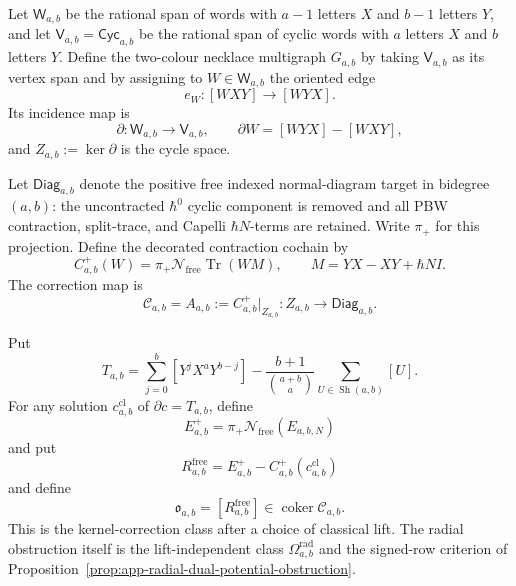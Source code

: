 \begin{defn}
\label{def:app-free-kernel-correction-obstruction}
  Let \(\mathsf W_{a,b}\) be the rational span of words with \(a-1\)
  letters \(X\) and \(b-1\) letters \(Y\), and let
  \(\mathsf V_{a,b}=\mathsf{Cyc}_{a,b}\) be the rational span of cyclic
  words with \(a\) letters \(X\) and \(b\) letters \(Y\).  Define the
  two-colour necklace multigraph \(G_{a,b}\) by taking
  \(\mathsf V_{a,b}\) as its vertex span and by assigning to
  \(W\in\mathsf W_{a,b}\) the oriented edge
  \[
    e_W:[WXY]\longrightarrow[WYX].
  \]
  Its incidence map is
  \[
    \partial\colon\mathsf W_{a,b}\to\mathsf V_{a,b},\qquad
    \partial W=[WYX]-[WXY],
  \]
  and \(Z_{a,b}:=\ker\partial\) is the cycle space.

  Let \(\mathsf{Diag}_{a,b}\) denote the positive free indexed
  normal-diagram target in bidegree \((a,b)\): the uncontracted
  \(\hbar^0\) cyclic component is removed and all PBW contraction,
  split-trace, and Capelli \(\hbar N\)-terms are retained.  Write
  \(\pi_+\) for this projection.  Define the decorated contraction
  cochain by
  \[
    C^+_{a,b}(W)
    =
    \pi_+\mathcal N_{\mathrm{free}}\operatorname{Tr}(WM),
    \qquad
    M=YX-XY+\hbar NI.
  \]
  The correction map is
  \[
    \mathcal C_{a,b}=A_{a,b}:=
    C^+_{a,b}|_{Z_{a,b}}\colon
    Z_{a,b}\longrightarrow\mathsf{Diag}_{a,b}.
  \]

  Put
  \[
    T_{a,b}=
    \sum_{j=0}^b[Y^jX^aY^{b-j}]
    -\frac{b+1}{\binom{a+b}{a}}
      \sum_{U\in\operatorname{Sh}(a,b)}[U].
  \]
  For any solution \(c^{\mathrm{cl}}_{a,b}\) of
  \(\partial c=T_{a,b}\), define
  \[
    E^+_{a,b}
    =
    \pi_+\mathcal N_{\mathrm{free}}(E_{a,b,N})
  \]
  and put
  \[
    R_{a,b}^{\mathrm{free}}
    =
    E^+_{a,b}-C^+_{a,b}(c^{\mathrm{cl}}_{a,b})
  \]
  and define
  \[
    \mathfrak o_{a,b}
    =
    [R_{a,b}^{\mathrm{free}}]\in
    \operatorname{coker}\mathcal C_{a,b}.
  \]
  This is the kernel-correction class after a choice of classical lift.
  The radial obstruction itself is the lift-independent class
  \(\Omega^{\mathrm{rad}}_{a,b}\) and the signed-row criterion of
  Proposition~\ref{prop:app-radial-dual-potential-obstruction}.
\end{defn}

